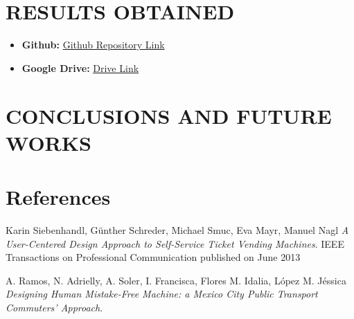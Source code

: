\documentclass{article}
\begin{document}
\section{RESULTS OBTAINED}
\begin{itemize}
    \item \textbf{Github: }\href{https://github.com/nihar1805/SOEN-6461-Project}{Github Repository Link}
    \item \textbf{Google Drive: }\href{https://drive.google.com/drive/folders/1vo4CgwjhUtiiPU7cmO34Ip_6ecx-gh1F?usp=share_link}{Drive Link}
\end{itemize}

\section{CONCLUSIONS AND FUTURE WORKS}


\section{References}

\begin{enumerate}
Karin Siebenhandl, Günther Schreder, Michael Smuc, Eva Mayr, Manuel Nagl
\textit{A User-Centered Design Approach to Self-Service Ticket Vending Machines}. 
IEEE Transactions on Professional Communication published on June 2013

A. Ramos, N. Adrielly, A. Soler, I. Francisca, Flores M. Idalia, López M. Jéssica
\textit{Designing Human Mistake-Free Machine: a Mexico City Public Transport Commuters’ Approach}.
\end{enumerate}
\end{document}
